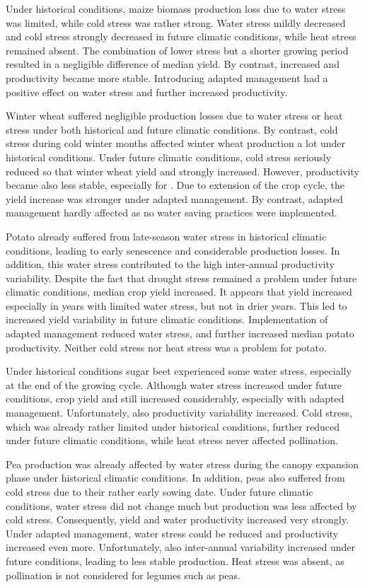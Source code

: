 Under historical conditions, maize biomass production loss due to water stress was limited, while cold stress was rather strong. Water stress mildly decreased and cold stress strongly decreased in future climatic conditions, while heat stress remained absent. The combination of lower stress but a shorter growing period resulted in a negligible difference of median yield. By contrast, \WPET increased and productivity became more stable. Introducing adapted management had a positive effect on water stress and further increased productivity.

Winter wheat suffered negligible production losses due to water stress or heat stress under both historical and future climatic conditions. By contrast, cold stress during cold winter months affected winter wheat production a lot under historical conditions. Under future climatic conditions, cold stress seriously reduced so that winter wheat yield and \WPET strongly increased. However, productivity became also less stable, especially for \WPET. Due to extension of the crop cycle, the yield increase was stronger under adapted management. By contrast, adapted management hardly affected \WPET  as no water saving practices were implemented. 

Potato already suffered from late-season water stress in historical climatic conditions, leading to early senescence and considerable production losses. In addition, this water stress contributed to the high inter-annual productivity variability. Despite the fact that drought stress remained a problem under future climatic conditions, median crop yield increased. It appears that yield increased especially in years with limited water stress, but not in drier years. This led to increased yield variability in future climatic conditions. Implementation of adapted management reduced water stress, and further increased median potato productivity. Neither cold stress nor heat stress was a problem for potato. 

Under historical conditions sugar beet experienced some water stress, especially at the end of the growing cycle. Although water stress increased under future conditions, crop yield and \WPET still increased considerably, especially with adapted management. Unfortunately, also productivity variability increased. Cold stress, which was already rather limited under historical conditions, further reduced under future climatic conditions, while heat stress never affected pollination.

Pea production was already affected by water stress during the canopy expansion phase under historical climatic conditions. In addition, peas also suffered from cold stress due to their rather early sowing date. Under future climatic conditions, water stress did not change much but production was less affected by cold stress. Consequently, yield and water productivity increased very strongly. Under adapted management, water stress could be reduced and productivity increased even more. Unfortunately, also inter-annual variability increased under future conditions, leading to less stable production. Heat stress was absent, as pollination is not considered for legumes such as peas. 

